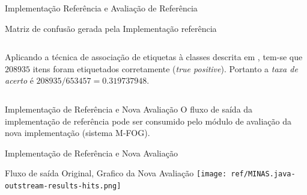 \documentclass[aspectratio=43,10pt]{beamer}
\newcommand{\mfog}{sistema M-FOG\xspace}
\begin{document}
\begin{frame}[fragile]{Implementação Referência e Avaliação de Referência}
\begin{alertblock}{Matriz de confusão gerada pela Implementação referência}
\begin{columns}[T,onlytextwidth]
      Aplicando a técnica de associação de etiquetas à classes descrita em ,
      tem-se que $208935$ itens foram etiquetados corretamente (\textit{true positive}).
      Portanto a \textsl{taxa de acerto} é $208935 / 653457 = 0.319737948$.
    \end{columns}
  \end{alertblock}
\end{frame}


\begin{frame}[fragile]{Implementação de Referência e Nova Avaliação}
  O fluxo de saída da implementação de referência pode ser consumido pelo módulo
  de avaliação da nova implementação (\mfog).
\end{frame}

\begin{frame}[fragile]{Implementação de Referência e Nova Avaliação}
  \begin{alertblock}{Fluxo de saída Original, Grafico da Nova Avaliação}
    \texttt{[image: ref/MINAS.java-outstream-results-hits.png]}
  \end{alertblock}
\end{frame}
\end{document}
